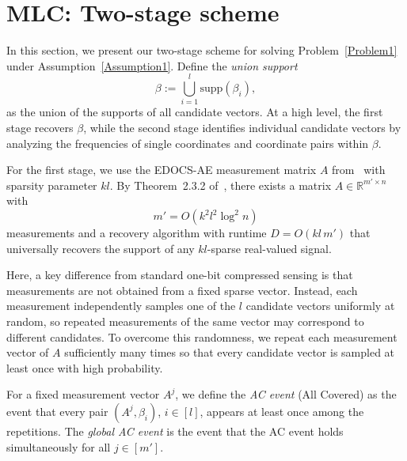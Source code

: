 \documentclass{article}
\newcommand{\xl}[1]{{\color{blue}#1}}
\newcommand{\supp}{\mathrm{supp}}
\begin{document}
%




\section{MLC: Two-stage scheme}\label{sec:2SUMLC} 
In this section, we present our two-stage scheme for solving Problem~\ref{Problem1} under Assumption~\ref{Assumption1}. Define the \emph{union support}
\[
\beta:=\bigcup_{i=1}^{l}\supp(\beta_i),
\]
as the union of the supports of all candidate vectors. At a high level, the first stage recovers $\beta$, while the second stage identifies individual candidate vectors by analyzing the frequencies of single coordinates and coordinate pairs within $\beta$.

For the first stage, we use the EDOCS-AE measurement matrix $A$ from~\cite{li2025support} with sparsity parameter $kl$. By Theorem~2.3.2 of~\cite{li2025support}, there exists a matrix $A\in\mathbb{R}^{m'\times n}$ with
\[
m'=O(k^2l^2\log^2 n)
\]
measurements and a recovery algorithm with runtime $D=O(kl\,m')$ that universally recovers the support of any $kl$-sparse real-valued signal.

Here, a key difference from standard one-bit compressed sensing is that measurements are not obtained from a fixed sparse vector. Instead, each measurement independently samples one of the $l$ candidate vectors uniformly at random, so repeated measurements of the same vector may correspond to different candidates. To overcome this randomness, we repeat each measurement vector of $A$ sufficiently many times so that every candidate vector is sampled at least once with high probability.

For a fixed measurement vector $A^j$, we define the \emph{AC event} (All Covered) as the event that every pair $(A^j,\beta_i)$, $i\in[l]$, appears at least once among the repetitions. The \emph{global AC event} is the event that the AC event holds simultaneously for all $j\in[m']$.
\end{document}
